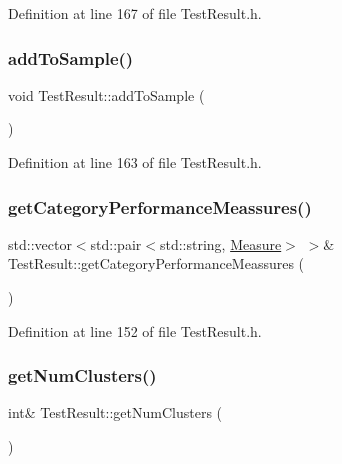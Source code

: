 Definition at line 167 of file Test\+Result.\+h.

\mbox{\label{class_test_result_a52297b1ef46add85147456a8011991a4}} 
\subsubsection{\texorpdfstring{add\+To\+Sample()}{addToSample()}}
{\footnotesize\ttfamily void Test\+Result\+::add\+To\+Sample (\begin{DoxyParamCaption}{ }\end{DoxyParamCaption})\hspace{0.3cm}{\ttfamily [inline]}}



Definition at line 163 of file Test\+Result.\+h.

\mbox{\label{class_test_result_a4bb4cc060985ad8a8b8bc12266daffd2}} 
\subsubsection{\texorpdfstring{get\+Category\+Performance\+Meassures()}{getCategoryPerformanceMeassures()}}
{\footnotesize\ttfamily std\+::vector$<$std\+::pair$<$std\+::string, \hyperlink{class_measure}{Measure}$>$ $>$\& Test\+Result\+::get\+Category\+Performance\+Meassures (\begin{DoxyParamCaption}{ }\end{DoxyParamCaption})\hspace{0.3cm}{\ttfamily [inline]}}



Definition at line 152 of file Test\+Result.\+h.

\mbox{\label{class_test_result_a6063b616fe294b8cee9efa1739958d04}} 
\subsubsection{\texorpdfstring{get\+Num\+Clusters()}{getNumClusters()}}
{\footnotesize\ttfamily int\& Test\+Result\+::get\+Num\+Clusters (\begin{DoxyParamCaption}{ }\end{DoxyParamCaption})\hspace{0.3cm}{\ttfamily [inline]}}

